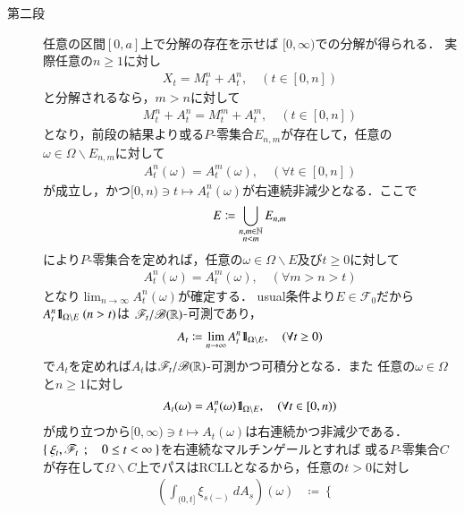 \begin{prf}[未修正]
\begin{description}
			\item[第二段]
				任意の区間$[0,a]$上で分解の存在を示せば
				$[0,\infty)$での分解が得られる．
				実際任意の$n \geq 1$に対し
				\begin{align}
					X_t = M^n_t + A^n_t, \quad (t \in [0,n])
				\end{align}
				と分解されるなら，$m > n$に対して
				\begin{align}
					M^n_t + A^n_t = M^m_t + A^m_t, \quad (t \in [0,n])
				\end{align}
				となり，前段の結果より或る$P$-零集合$E_{n,m}$が存在して，任意の$\omega \in \Omega \backslash E_{n,m}$に対して
				\begin{align}
					A^n_t(\omega) = A^m_t(\omega), \quad (\forall t \in [0,n])
				\end{align}
				が成立し，かつ$[0,n) \ni t \longmapsto A^n_t(\omega)$が右連続非減少となる．ここで
				\begin{align}
					E \coloneqq \bigcup_{\substack{n,m \in \mathbb{N} \\ n<m}} E_{n,m}
				\end{align}
				により$P$-零集合を定めれば，任意の$\omega \in \Omega \backslash E$及び$t \geq 0$に対して
				\begin{align}
					A^n_t(\omega) = A^m_t(\omega), \quad (\forall m > n > t)
				\end{align}
				となり$\lim_{n \to \infty} A^n_t(\omega)$が確定する．
				usual条件より$E \in \mathscr{F}_0$だから$A^n_t \mbox{1}\hspace{-0.25em}\mbox{l}_{\Omega \backslash E}\ (n > t)$は
				$\mathscr{F}_t/\mathscr{B}(\mathbb{R})$-可測であり，
				\begin{align}
					A_t \coloneqq  \lim_{n \to \infty} A^n_t \mbox{1}\hspace{-0.25em}\mbox{l}_{\Omega \backslash E},
					\quad (\forall t \geq 0)
				\end{align}
				で$A_t$を定めれば$A_t$は$\mathscr{F}_t/\mathscr{B}(\mathbb{R})$-可測かつ可積分となる．また
				任意の$\omega \in \Omega$と$n \geq 1$に対し
				\begin{align}
					A_t(\omega) = A^n_t(\omega) \mbox{1}\hspace{-0.25em}\mbox{l}_{\Omega \backslash E}, \quad (\forall t \in [0,n))
				\end{align}
				が成り立つから$[0,\infty) \ni t \longmapsto A_t(\omega)$は右連続かつ非減少である．
				$\left\{\ \xi_t,\mathscr{F}_t\ \, ; \quad 0 \leq t < \infty\ \right\}$を右連続なマルチンゲールとすれば
				或る$P$-零集合$C$が存在して$\Omega \backslash C$上でパスはRCLLとなるから，任意の$t > 0$に対し
				\begin{align}
					\left( \int_{(0,t]} \xi_{s(-)}\ dA_s \right)(\omega) &\coloneqq
					\begin{cases}

\end{cases}
\end{align}
\end{description}
\end{prf}
